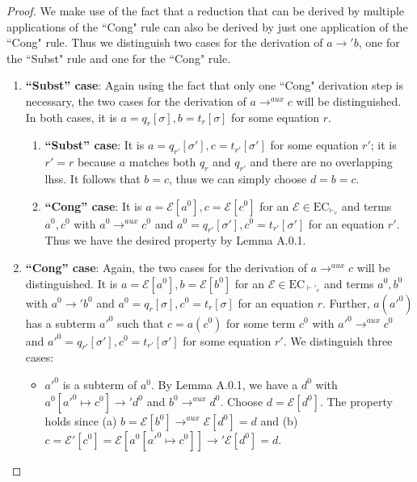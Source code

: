 \cdpaux*
\begin{proof}
We make use of the fact that a reduction that can be derived by multiple applications of the ``Cong" rule can also be derived by just one application of the ``Cong" rule. Thus we distinguish two cases for the derivation of $a \longrightarrow' b$, one for the ``Subst" rule and one for the ``Cong" rule.

\begin{enumerate}
\item \textbf{``Subst'' case}: Again using the fact that only one ``Cong" derivation step is necessary, the two cases for the derivation of $a \longrightarrow^{aux} c$ will be distinguished. In both cases, it is $a = q_r[\sigma], b = t_r[\sigma]$ for some equation $r$.

\begin{enumerate}
\item \textbf{``Subst'' case}: It is $a = q_{r'}[\sigma'], c = t_{r'}[\sigma']$ for some equation $r'$; it is $r' = r$ because $a$ matches both $q_r$ and $q_{r'}$ and there are no overlapping lhss. It follows that $b = c$, thus we can simply choose $d = b = c$.

\item \textbf{``Cong'' case}: It is $a = \mathcal{E}[a^0], c = \mathcal{E}[c^0]$ for an $\mathcal{E} \in \textrm{EC}_{\vdash_v}$ and terms $a^0, c^0$ with $a^0 \longrightarrow^{aux} c^0$ and $a^0 = q_{r'}[\sigma'], c^0 = t_{r'}[\sigma']$ for an equation $r'$. Thus we have the desired property by Lemma A.0.1.
\end{enumerate}

\item \textbf{``Cong'' case}: Again, the two cases for the derivation of $a \longrightarrow^{aux} c$ will be distinguished. It is $a = \mathcal{E}[a^0], b = \mathcal{E}[b^0]$ for an $\mathcal{E} \in \textrm{EC}_{\vdash'_v}$ and terms $a^0, b^0$ with $a^0 \longrightarrow' b^0$ and $a^0 = q_r[\sigma], c^0 = t_r[\sigma]$ for an equation $r$. Further, $a(a'^0)$ has a subterm $a'^0$ such that $c = a(c^0)$ for some term $c^0$ with $a'^0 \longrightarrow^{aux} c^0$ and $a'^0 = q_{r'}[\sigma'], c^0 = t_{r'}[\sigma']$ for some equation $r'$. We distinguish three cases:
\begin{itemize}
\item $a'^0$ is a subterm of $a^0$. By Lemma A.0.1, we have a $d^0$ with $a^0[a'^0 \mapsto c^0] \longrightarrow' d^0$ and $b^0 \longrightarrow^{aux} d^0$. Choose $d = \mathcal{E}[d^0]$. The property holds since (a) $b = \mathcal{E}[b^0] \longrightarrow^{aux} \mathcal{E}[d^0] = d$ and (b) $c = \mathcal{E}'[c^0] = \mathcal{E}[a^0[a'^0 \mapsto c^0]] \longrightarrow' \mathcal{E}[d^0] = d$.


\end{itemize}
\end{enumerate}
\end{proof}
